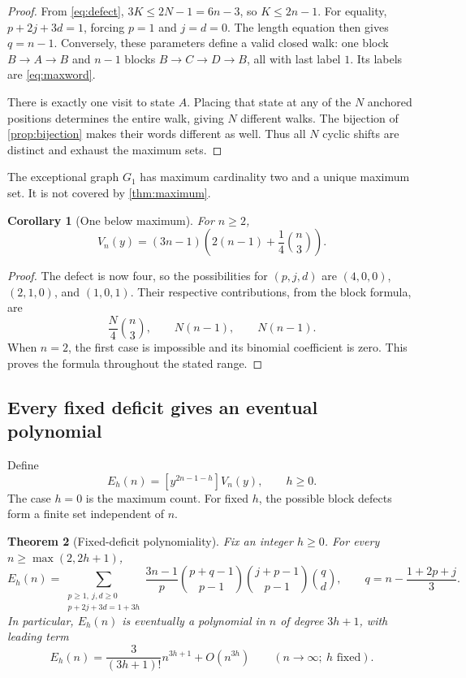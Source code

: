 \documentclass[11pt,a4paper]{article}
\newtheorem{theorem}{Theorem}[section]
\newtheorem{corollary}[theorem]{Corollary}
\theoremstyle{definition}
\begin{document}
\begin{proof}
From \cref{eq:defect}, $3K\le2N-1=6n-3$, so $K\le2n-1$.
For equality, $p+2j+3d=1$, forcing $p=1$ and $j=d=0$. The length equation
then gives $q=n-1$. Conversely, these parameters define a valid closed walk:
one block $B\to A\to B$ and $n-1$ blocks $B\to C\to D\to B$, all with
last label $1$. Its labels are \cref{eq:maxword}.

There is exactly one visit to state $A$. Placing that state at any of the
$N$ anchored positions determines the entire walk, giving $N$ different
walks. The bijection of \cref{prop:bijection} makes their words different as
well. Thus all $N$ cyclic shifts are distinct and exhaust the maximum sets.
\end{proof}

The exceptional graph $G_1$ has maximum cardinality two and a unique maximum
set. It is not covered by \cref{thm:maximum}.

\begin{corollary}[One below maximum]
\label{cor:nearmax}
For $n\ge2$,
\begin{equation}
 [y^{2n-2}]V_n(y)
 =(3n-1)\left(2(n-1)+\frac14\binom n3\right).
 \label{eq:nearmax}
\end{equation}
\end{corollary}

\begin{proof}
The defect is now four, so the possibilities for $(p,j,d)$ are
$(4,0,0)$, $(2,1,0)$, and $(1,0,1)$.
Their respective contributions, from the block formula, are
\[
 \frac{N}{4}\binom n3,\qquad N(n-1),\qquad N(n-1).
\]
When $n=2$, the first case is impossible and its binomial coefficient is
zero. This proves the formula throughout the stated range.
\end{proof}

\subsection{Every fixed deficit gives an eventual polynomial}

Define
\begin{equation}
 E_h(n)=[y^{2n-1-h}]V_n(y),\qquad h\ge0.
 \label{eq:Eh}
\end{equation}
The case $h=0$ is the maximum count. For fixed $h$, the possible block
defects form a finite set independent of $n$.

\begin{theorem}[Fixed-deficit polynomiality]
\label{thm:deficit}
Fix an integer $h\ge0$. For every $n\ge\max(2,2h+1)$,
\begin{equation}
 E_h(n)=
 \sum_{\substack{p\ge1,\ j,d\ge0\\p+2j+3d=1+3h}}
 \frac{3n-1}{p}
 \binom{p+q-1}{p-1}
 \binom{j+p-1}{p-1}\binom qd,
 \qquad q=n-\frac{1+2p+j}{3}.
 \label{eq:deficitformula}
\end{equation}
In particular, $E_h(n)$ is eventually a polynomial in $n$ of degree $3h+1$,
with leading term
\begin{equation}
 E_h(n)=\frac{3}{(3h+1)!}n^{3h+1}+O(n^{3h})
 \qquad(n\to\infty;\ h\text{ fixed}).
 \label{eq:deficitlead}
\end{equation}
\end{theorem}
\end{document}
